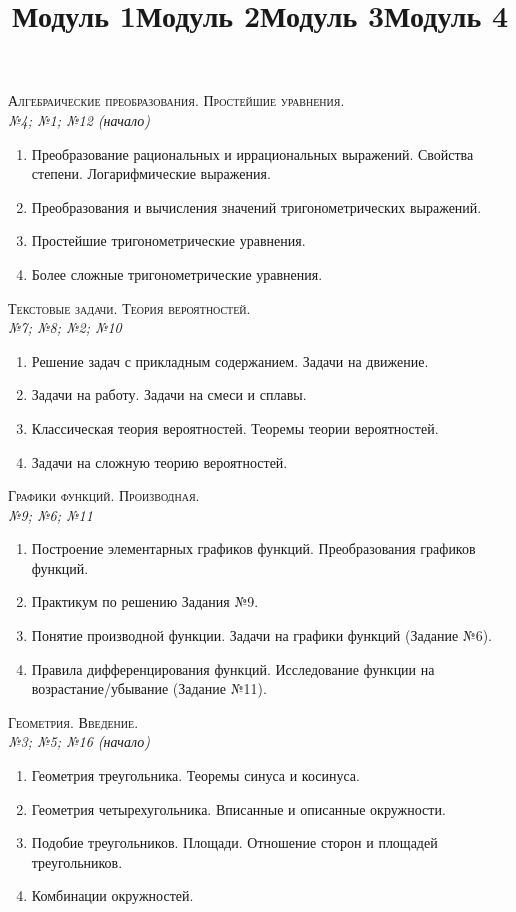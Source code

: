 \documentclass[12pt, a4paper]{article}
\begin{document}
	
\title{Модуль 1}
\center
\textsc{Алгебраические преобразования. Простейшие уравнения.}\\[0.5em]
\textit{№4; №1; №12 (начало)}
\begin{enumerate}[label=\textbf{\arabic*})]
	\item Преобразование рациональных и иррациональных выражений. Свойства степени. Логарифмические выражения.
	\item Преобразования и вычисления значений тригонометрических выражений.
	\item Простейшие тригонометрические уравнения.
	\item Более сложные тригонометрические уравнения.
\end{enumerate}
\title{Модуль 2}
\textsc{Текстовые задачи. Теория вероятностей.}\\[0.5em]
\textit{№7; №8; №2; №10}
\begin{enumerate}[label=\textbf{\arabic*})]
	\item Решение задач с прикладным содержанием. Задачи на движение.
	\item Задачи на работу. Задачи на смеси и сплавы.
	\item Классическая теория вероятностей. Теоремы теории вероятностей.
	\item Задачи на сложную теорию вероятностей.
\end{enumerate}
\title{Модуль 3}
\textsc{Графики функций. Производная.}\\[0.5em]
\textit{№9; №6; №11}
\begin{enumerate}[label=\textbf{\arabic*})]
	\item Построение элементарных графиков функций. Преобразования графиков функций.
	\item Практикум по решению Задания №9.
	\item Понятие производной функции. Задачи на графики функций (Задание №6).
	\item Правила дифференцирования функций. Исследование функции на возрастание/убывание (Задание №11).
\end{enumerate}
\title{Модуль 4}
\textsc{Геометрия. Введение.}\\[0.5em]
\textit{№3; №5; №16 (начало)}
\begin{enumerate}[label=\textbf{\arabic*})]
	\item Геометрия треугольника. Теоремы синуса и косинуса.
	\item Геометрия четырехугольника. Вписанные и описанные окружности.
	\item Подобие треугольников. Площади. Отношение сторон и площадей треугольников.
	\item Комбинации окружностей.
\end{enumerate}
\end{document}
